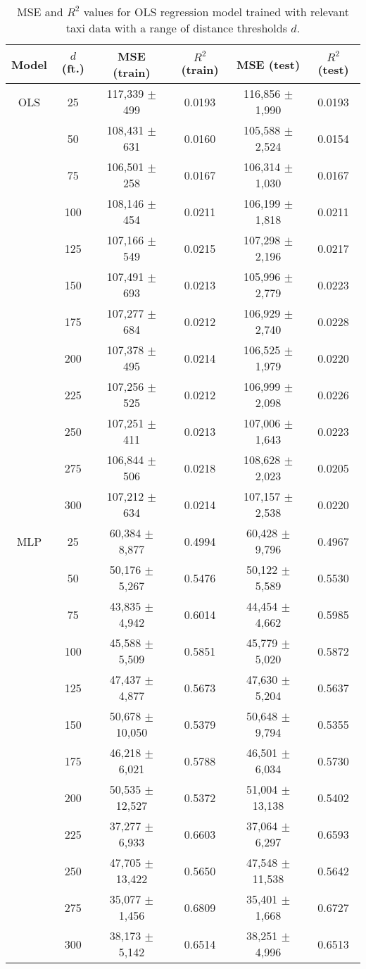 \documentclass[useAMS, usenatbib]{biom}
\begin{document}
\begin{table}
\caption{MSE and $R^2$ values for OLS regression model trained with relevant taxi data with a range of distance thresholds $d$.}
\label{t:taxi_performance}
\begin{center}
\resizebox{\columnwidth}{!}
{
 \begin{tabular}{||c|c|c|c|c|c||}
 \hline
 Model & $d$ (ft.) & MSE (train) & $R^2$ (train) & MSE (test) & $R^2$ (test) \\
 \hline
 OLS & 25 & 117,339 $\pm$ 499 & 0.0193 & 116,856 $\pm$ 1,990 & 0.0193 \\
 & 50 & 108,431 $\pm$ 631 & 0.0160 & 105,588 $\pm$ 2,524 & 0.0154 \\
 & 75 & 106,501 $\pm$ 258 & 0.0167 & 106,314 $\pm$ 1,030 & 0.0167 \\
 & 100 & 108,146 $\pm$ 454 & 0.0211 & 106,199 $\pm$ 1,818 & 0.0211 \\
 & 125 & 107,166 $\pm$ 549 & 0.0215 & 107,298 $\pm$ 2,196 & 0.0217 \\
 & 150 & 107,491 $\pm$ 693 & 0.0213 & 105,996 $\pm$ 2,779 & 0.0223 \\
 & 175 & 107,277 $\pm$ 684 & 0.0212 & 106,929 $\pm$ 2,740 & 0.0228 \\
 & 200 & 107,378 $\pm$ 495 & 0.0214 & 106,525 $\pm$ 1,979 & 0.0220 \\
 & 225 & 107,256 $\pm$ 525 & 0.0212 & 106,999 $\pm$ 2,098 & 0.0226 \\
 & 250 & 107,251 $\pm$ 411 & 0.0213 & 107,006 $\pm$ 1,643 & 0.0223 \\
 & 275 & 106,844 $\pm$ 506 & 0.0218 & 108,628 $\pm$ 2,023 & 0.0205 \\
 & 300 & 107,212 $\pm$ 634 & 0.0214 & 107,157 $\pm$ 2,538 & 0.0220 \\
 \hline
 MLP & 25 & 60,384 $\pm$ 8,877 & 0.4994 & 60,428 $\pm$ 9,796 & 0.4967 \\
 & 50 & 50,176 $\pm$ 5,267 & 0.5476 & 50,122 $\pm$ 5,589 & 0.5530 \\
 & 75 & 43,835 $\pm$ 4,942 & 0.6014 & 44,454 $\pm$ 4,662 & 0.5985 \\
 & 100 & 45,588 $\pm$ 5,509 & 0.5851 & 45,779 $\pm$ 5,020 & 0.5872 \\
 & 125 & 47,437 $\pm$ 4,877 & 0.5673 & 47,630 $\pm$ 5,204 & 0.5637 \\
 & 150 & 50,678 $\pm$ 10,050 & 0.5379 & 50,648 $\pm$ 9,794 & 0.5355 \\
 & 175 & 46,218 $\pm$ 6,021 & 0.5788 & 46,501 $\pm$ 6,034 & 0.5730 \\
 & 200 & 50,535 $\pm$ 12,527 & 0.5372 & 51,004 $\pm$ 13,138 & 0.5402 \\
 & 225 & 37,277 $\pm$ 6,933 & 0.6603 & 37,064 $\pm$ 6,297 & 0.6593 \\
 & 250 & 47,705 $\pm$ 13,422 & 0.5650 & 47,548 $\pm$ 11,538 & 0.5642 \\
 & 275 & 35,077 $\pm$ 1,456 & 0.6809 & 35,401 $\pm$ 1,668 & 0.6727 \\
 & 300 & 38,173 $\pm$ 5,142 & 0.6514 & 38,251 $\pm$ 4,996 & 0.6513 \\
 \hline
\end{tabular}
}
\end{center}
\end{table}
\end{document}
